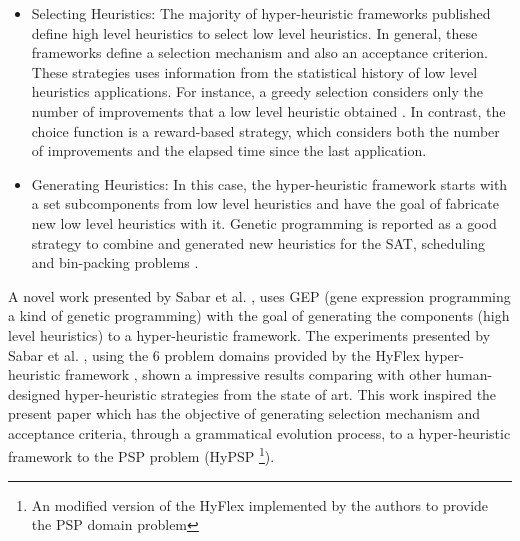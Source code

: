 \documentclass[conference]{IEEEtran}
\begin{document}
\begin{itemize}
	\item Selecting Heuristics: The majority of hyper-heuristic frameworks published define high level heuristics to select low level heuristics. In general, these frameworks define a selection mechanism and also an acceptance criterion. These strategies uses information from the statistical history of low level heuristics applications. For instance, a greedy selection considers only the number of improvements that a low level heuristic obtained \cite{burke2013hyper}. In contrast, the choice function \cite{burke2013hyper} is a reward-based strategy, which considers both the number of improvements and the elapsed time since the last application.
	
	
	
	
	
	
	
	
	
%	
	

	\item Generating Heuristics: In this case, the hyper-heuristic framework starts with a set subcomponents from low level heuristics and have the goal of fabricate new low level heuristics with it. Genetic programming is reported as a good strategy to combine and generated new heuristics for the SAT, scheduling and bin-packing problems \cite{sabar2015automatic}.
\end{itemize}

A novel work presented by Sabar et al. \cite{sabar2015automatic}, uses GEP (gene expression programming a kind of genetic programming) with the goal of generating the components (high level heuristics) to a hyper-heuristic framework. The experiments presented by Sabar et al. \cite{sabar2015automatic}, using the 6 problem domains provided by the HyFlex hyper-heuristic framework \cite{ochoa2012hyflex}, shown a impressive results comparing with other human-designed hyper-heuristic strategies from the state of art. This work inspired the present paper which has the objective of generating selection mechanism and acceptance criteria, through a grammatical evolution process, to a hyper-heuristic framework to the PSP problem (HyPSP \footnote{An modified version of the HyFlex \cite{ochoa2012hyflex} implemented by the authors to provide the PSP domain problem}). 
\end{document}
